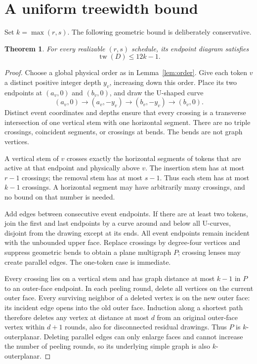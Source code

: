 \documentclass[11pt]{article}
\newtheorem{theorem}{Theorem}[section]
\theoremstyle{definition}\newtheorem{definition}[theorem]{Definition}
\theoremstyle{remark}\newtheorem{remark}[theorem]{Remark}
\newcommand{\tw}{\operatorname{tw}}
\begin{document}
\section{A uniform treewidth bound}\label{sec:width}
Set $k=\max(r,s)$. The following geometric bound is deliberately conservative.
\begin{theorem}\label{thm:width}
For every realizable $(r,s)$ schedule, its endpoint diagram satisfies
\[
 \tw(D)\le12k-1.
\]
\end{theorem}
\begin{proof}
Choose a global physical order as in Lemma~\ref{lem:order}. Give each token $v$ a distinct positive integer depth $y_v$, increasing down this order. Place its two endpoints at $(a_v,0)$ and $(b_v,0)$, and draw the U-shaped curve
\[
 (a_v,0)\longrightarrow(a_v,-y_v)\longrightarrow(b_v,-y_v)
 \longrightarrow(b_v,0).
\]
Distinct event coordinates and depths ensure that every crossing is a transverse intersection of one vertical stem with one horizontal segment. There are no triple crossings, coincident segments, or crossings at bends. The bends are not graph vertices.

A vertical stem of $v$ crosses exactly the horizontal segments of tokens that are active at that endpoint and physically above $v$. The insertion stem has at most $r-1$ crossings; the removal stem has at most $s-1$. Thus each stem has at most $k-1$ crossings. A horizontal segment may have arbitrarily many crossings, and no bound on that number is needed.

Add edges between consecutive event endpoints. If there are at least two tokens, join the first and last endpoints by a curve around and below all U-curves, disjoint from the drawing except at its ends. All event endpoints remain incident with the unbounded upper face. Replace crossings by degree-four vertices and suppress geometric bends to obtain a plane multigraph $P$; crossing lenses may create parallel edges. The one-token case is immediate.

Every crossing lies on a vertical stem and has graph distance at most $k-1$ in $P$ to an outer-face endpoint. In each peeling round, delete all vertices on the current outer face. Every surviving neighbor of a deleted vertex is on the new outer face: its incident edge opens into the old outer face. Induction along a shortest path therefore deletes any vertex at distance at most $d$ from an original outer-face vertex within $d+1$ rounds, also for disconnected residual drawings. Thus $P$ is $k$-outerplanar. Deleting parallel edges can only enlarge faces and cannot increase the number of peeling rounds, so its underlying simple graph is also $k$-outerplanar.


\end{proof}
\end{document}
